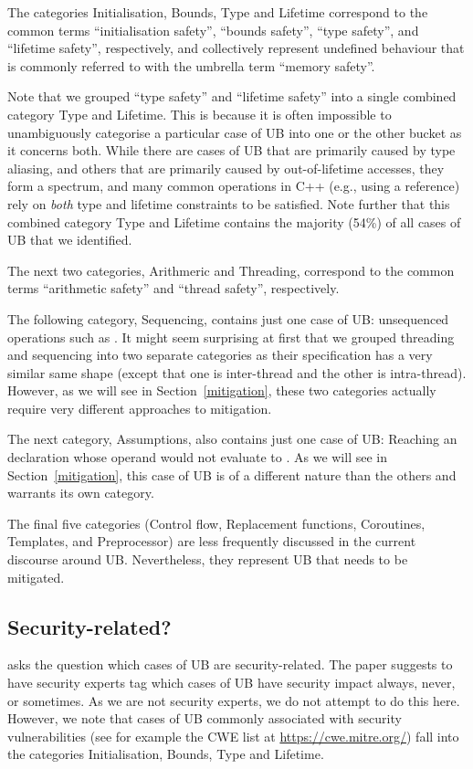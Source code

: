 The categories Initialisation, Bounds, Type and Lifetime correspond to the common terms  ``initialisation safety'',  ``bounds safety'', ``type safety'',  and ``lifetime safety'', respectively, and collectively represent undefined behaviour that is commonly referred to with the umbrella term ``memory safety''. 

Note that we grouped ``type safety'' and ``lifetime safety'' into a single combined category Type and Lifetime. This is because it is often impossible to unambiguously categorise a particular case of UB into one or the other bucket as it concerns both. While there are cases of UB that are primarily caused by type aliasing, and others that are primarily caused by out-of-lifetime accesses, they form a spectrum, and many common operations in C++ (e.g., using a reference) rely on \emph{both} type and lifetime constraints to be satisfied. Note further that this combined category Type and Lifetime contains the majority (54\%) of all cases of UB that we identified.

The next two categories, Arithmeric and Threading, correspond to the common terms ``arithmetic safety'' and ``thread safety'', respectively.

The following category, Sequencing, contains just one case of UB: unsequenced operations such as \mbox{}. It might seem surprising at first that we grouped threading and sequencing into two separate categories as their specification has a very similar same shape (except that one is inter-thread and the other is intra-thread). However, as we will see in Section~\ref{mitigation}, these two categories actually require very different approaches to mitigation.

The next category, Assumptions, also contains just one case of UB: Reaching an \tcode{[[assume]]} declaration whose operand would not evaluate to . As we will see in Section~\ref{mitigation}, this case of UB is of a different nature than the others and warrants its own category.

The final five categories (Control flow, Replacement functions, Coroutines, Templates, and Preprocessor) are less frequently discussed in the current discourse around UB. Nevertheless, they represent UB that needs to be mitigated.

\subsection{Security-related?}

\cite{P3656R1} asks the question which cases of UB are security-related. The paper suggests to have security experts tag which cases of UB have security impact always, never, or sometimes. As we are not security experts, we do not attempt to do this here. However, we note that cases of UB commonly associated with security vulnerabilities (see for example the CWE list at \url{https://cwe.mitre.org/}) fall into the categories Initialisation, Bounds, Type and Lifetime. 

